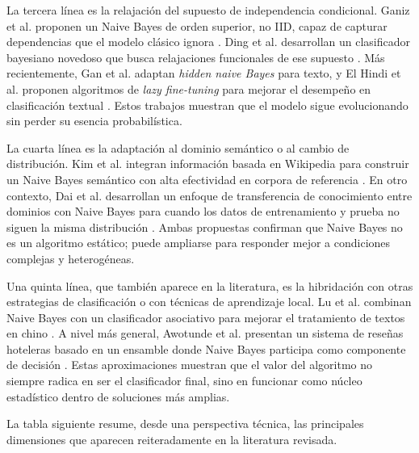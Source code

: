 La tercera línea es la relajación del supuesto de independencia condicional. Ganiz et al. proponen un Naive Bayes de orden superior, no IID, capaz de capturar dependencias que el modelo clásico ignora \cite{Ganiz20111022}. Ding et al. desarrollan un clasificador bayesiano novedoso que busca relajaciones funcionales de ese supuesto \cite{4554061}. Más recientemente, Gan et al. adaptan \textit{hidden naive Bayes} para texto, y El Hindi et al. proponen algoritmos de \textit{lazy fine-tuning} para mejorar el desempeño en clasificación textual \cite{Gan2021,ELHINDI2020106652}. Estos trabajos muestran que el modelo sigue evolucionando sin perder su esencia probabilística.

La cuarta línea es la adaptación al dominio semántico o al cambio de distribución. Kim et al. integran información basada en Wikipedia para construir un Naive Bayes semántico con alta efectividad en corpora de referencia \cite{KIM2018128}. En otro contexto, Dai et al. desarrollan un enfoque de transferencia de conocimiento entre dominios con Naive Bayes para cuando los datos de entrenamiento y prueba no siguen la misma distribución \cite{10.5555/1619645.1619732}. Ambas propuestas confirman que Naive Bayes no es un algoritmo estático; puede ampliarse para responder mejor a condiciones complejas y heterogéneas.

Una quinta línea, que también aparece en la literatura, es la hibridación con otras estrategias de clasificación o con técnicas de aprendizaje local. Lu et al. combinan Naive Bayes con un clasificador asociativo para mejorar el tratamiento de textos en chino \cite{LU2010598}. A nivel más general, Awotunde et al. presentan un sistema de reseñas hoteleras basado en un ensamble donde Naive Bayes participa como componente de decisión \cite{Awotunde2023131}. Estas aproximaciones muestran que el valor del algoritmo no siempre radica en ser el clasificador final, sino en funcionar como núcleo estadístico dentro de soluciones más amplias.

La tabla siguiente resume, desde una perspectiva técnica, las principales dimensiones que aparecen reiteradamente en la literatura revisada.

